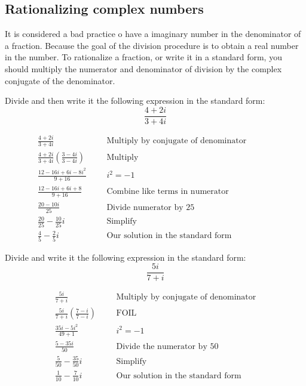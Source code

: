 \subsection{Rationalizing complex numbers}
It is considered a bad practice o have a imaginary number in the denominator of a fraction. Because the goal of the division procedure is to obtain a real number in the number. To rationalize a fraction, or write it in a standard form, you should multiply the numerator and denominator of division by the complex conjugate of the denominator.
\begin{exa}
    Divide and then write it the following expression in the standard form:
    \[ \frac{4+2i}{3+4i} \]
\end{exa}
 \begin{align*}
	\frac{4+2i}{3+4i}& & &\text{Multiply by conjugate of denominator}\\
	\frac{4+2i}{3+4i}\left(\frac{3-4i}{3-4i} \right)& & &\text{Multiply}\\
	\frac{12-16i+6i-8i^2}{9+16}& & &\text{$i^2=-1$}\\
 	\frac{12-16i+6i+8}{9+16}& & &\text{Combine like terms in numerator}&&&&\\
 	\frac{20-10i}{25}& & &\text{Divide numerator by 25}&&&&\\
 	\frac{20}{25}-\frac{10}{25}i& & &\text{Simplify}&&&&\\
 	\frac{4}{5}-\frac{2}{5}i& & &\text{Our solution in the standard form}&&&&
 \end{align*}
\begin{exa}
    Divide and write it the following expression in the standard form:
    \[ \frac{5i}{7+i} \]
\end{exa}
 \begin{align*}
	\frac{5i}{7+i}& & &\text{Multiply by conjugate of denominator}\\
	\frac{5i}{7+i}\left(\frac{7-i}{7-i} \right)& & &\text{FOIL}\\
	\frac{35i-5i^2}{49+1}& & &\text{$i^2=-1$}\\
 	\frac{5-35i}{50}& & &\text{Divide the numerator by 50}\\
 	\frac{5}{50}-\frac{35}{50}i& & &\text{Simplify}\\
 	\frac{1}{10}-\frac{7}{10}i& & &\text{Our solution in the standard form}
 \end{align*}

